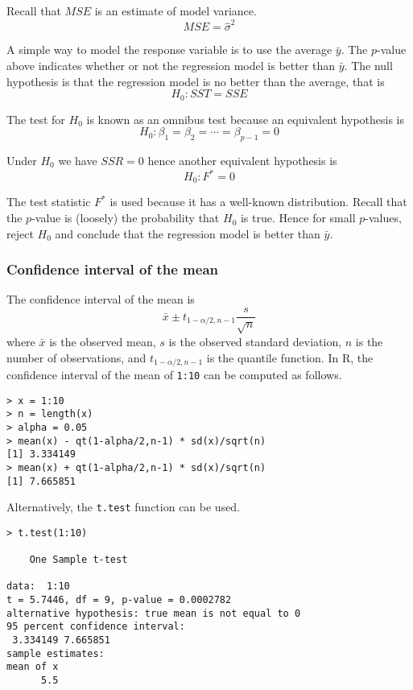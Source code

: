\documentclass[12pt]{article}
\begin{document}
Recall that $MSE$ is an estimate of model variance.
\[
MSE=\hat\sigma^2
\]

A simple way to model the response variable is to use the average $\bar y$.
The $p$-value above indicates whether or not the regression model
is better than $\bar y$.
The null hypothesis is that the regression model is no better
than the average, that is
\[
H_0:SST=SSE
\]

The test for $H_0$ is known as an omnibus test because an
equivalent hypothesis is
\[
H_0:\beta_1=\beta_2=\cdots=\beta_{p-1}=0
\]

Under $H_0$ we have $SSR=0$ hence another
equivalent hypothesis is
\[
H_0:F^*=0
\]

The test statistic $F^*$ is used
because it has a well-known distribution.
Recall that the $p$-value is (loosely) the probability
that $H_0$ is true.
Hence for small $p$-values, reject $H_0$ and
conclude that the regression model is better than $\bar y$.

\subsubsection*{Confidence interval of the mean}
The confidence interval of the mean is
\[
\bar x\pm t_{1-\alpha/2, n-1}\frac{s}{\sqrt n}
\]
where $\bar x$ is the observed mean,
$s$ is the observed standard deviation,
$n$ is the number of observations,
and $t_{1-\alpha/2, n-1}$ is the quantile function.
In R, the confidence interval of the mean of \verb$1:10$
can be computed as follows.

{\footnotesize\begin{verbatim}
> x = 1:10
> n = length(x)
> alpha = 0.05
> mean(x) - qt(1-alpha/2,n-1) * sd(x)/sqrt(n)
[1] 3.334149
> mean(x) + qt(1-alpha/2,n-1) * sd(x)/sqrt(n)
[1] 7.665851
\end{verbatim}}

Alternatively, the \verb$t.test$ function can be used.

{\footnotesize\begin{verbatim}
> t.test(1:10)

	One Sample t-test

data:  1:10
t = 5.7446, df = 9, p-value = 0.0002782
alternative hypothesis: true mean is not equal to 0
95 percent confidence interval:
 3.334149 7.665851
sample estimates:
mean of x 
      5.5 
\end{verbatim}}
\end{document}
